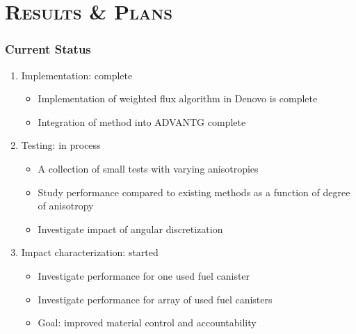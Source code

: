 \documentclass[handout]{beamer}
\renewcommand{\(}{\begin{columns}}
\renewcommand{\)}{\end{columns}}
\newcommand{\<}[1]{\begin{column}{#1}}
\renewcommand{\>}{\end{column}}
\begin{document}
\section{\scshape Results \& Plans}
\begin{frame}[fragile]
  \frametitle{Current Status}

    \begin{enumerate}
    \item Implementation: \alert{complete}
      \begin{itemize}
      \item Implementation of weighted flux algorithm in Denovo \cite{Evans2010} is 
      complete
      \item Integration of method into ADVANTG complete
      \end{itemize} 
      \vspace*{0.5em}
      \pause
    \item Testing: \alert{in process}
      \begin{itemize}
      \item A collection of small tests with varying anisotropies
      \item Study performance compared to existing methods as a function of degree of anisotropy
      \item Investigate impact of angular discretization
      \end{itemize}
      \vspace*{0.5em}
      \pause
    \item Impact characterization: \alert{started}
      \begin{itemize}
      \item Investigate performance for one used fuel canister
      \item Investigate performance for array of used fuel canisters
      \item \alert{Goal}: improved material control and accountability
      \end{itemize}
    \end{enumerate}

	
\end{frame}
\end{document}
